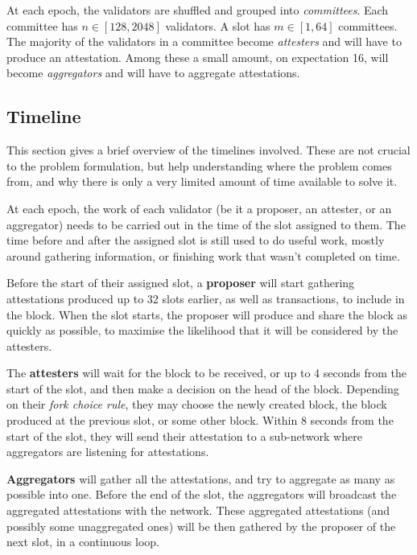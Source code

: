 \documentclass{article}
\begin{document}
At each epoch, the validators are shuffled and grouped into \emph{committees}.
Each committee has $n \in \left[128, 2048\right]$ validators. A slot has $m \in
\left[1, 64\right]$ committees. The majority of the validators in a committee
become \emph{attesters} and will have to produce an attestation. Among these a
small amount, on expectation 16, will become \emph{aggregators} and will have
to aggregate attestations. 

\subsection{Timeline}

This section gives a brief overview of the timelines involved. These are not
crucial to the problem formulation, but help understanding where the problem
comes from, and why there is only a very limited amount of time available to
solve it.

At each epoch, the work of each validator (be it a proposer, an attester, or an
aggregator) needs to be carried out in the time of the slot assigned to them.
The time before and after the assigned slot is still used to do useful work,
mostly around gathering information, or finishing work that wasn't completed on
time.

Before the start of their assigned slot, a \textbf{proposer} will start
gathering attestations produced up to 32 slots earlier, as well as
transactions, to include in the block. When the slot starts, the proposer will
produce and share the block as quickly as possible, to maximise the likelihood
that it will be considered by the attesters.

The \textbf{attesters} will wait for the block to be received, or up to 4
seconds from the start of the slot, and then make a decision on the head of the
block. Depending on their \emph{fork choice rule}, they may choose the newly
created block, the block produced at the previous slot, or some other block.  
Within 8 seconds from the start of the slot, they will send their attestation
to a sub-network where aggregators are listening for attestations.

\textbf{Aggregators} will gather all the attestations, and try to aggregate as
many as possible into one. Before the end of the slot,
the aggregators will broadcast the aggregated attestations with the network.  
These aggregated attestations (and possibly some unaggregated ones) will be
then gathered by the proposer of the next slot, in a continuous loop.
\end{document}
